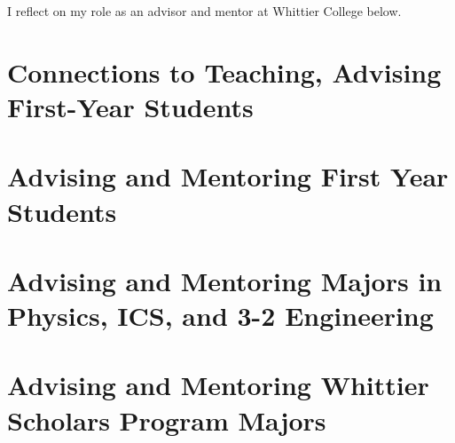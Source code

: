 \documentclass[../../main.tex]{subfiles}
\begin{document}
\label{sec:advising_mentoring}

I reflect on my role as an advisor and mentor at Whittier College below.

\section{Connections to Teaching, Advising First-Year Students}
\label{sec:adv_teaching}

\begin{flushleft}

\end{flushleft}

\section{Advising and Mentoring First Year Students}
\label{sec:first_year_2}

\begin{flushleft}

\end{flushleft}

\section{Advising and Mentoring Majors in Physics, ICS, and 3-2 Engineering}
\label{sec:adv_stem}

\begin{flushleft}

\end{flushleft}

\section{Advising and Mentoring Whittier Scholars Program Majors}
\label{sec:adv_wsp}

\begin{flushleft}

\end{flushleft}
\end{document}
